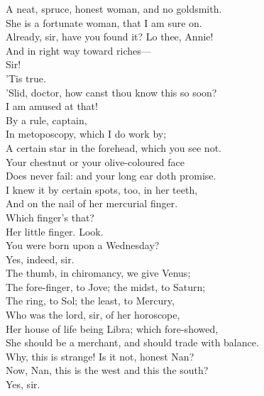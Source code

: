 \documentclass[a4paper,oneside,12pt]{memoir}
\begin{document}
\begin{drama*}
A neat, spruce, honest woman, and no goldsmith.\\
\subtlespeaks She is a fortunate woman, that I am sure on.\\
\facespeaks Already, sir, have you found it? Lo thee, Annie!\\
\subtlespeaks And in right way toward riches---\\
\facespeaks {} Sir!\\
\subtlespeaks {} 'Tis true.\\
\facespeaks 'Slid, doctor, how canst thou know this so soon?\\
I am amused at that!\\
\subtlespeaks {} By a rule, captain,\\
In metoposcopy, which I do work by;\\
A certain star in the forehead, which you see not.\\
Your chestnut or your olive-coloured face\\
Does never fail: and your long ear doth promise.\\
I knew it by certain spots, too, in her teeth,\\
And on the nail of her mercurial finger.\\
\facespeaks Which finger's that?\\
\subtlespeaks {} Her little finger. Look.\\
You were born upon a Wednesday?\\
\druggerspeaks {} Yes, indeed, sir.\\
\subtlespeaks The thumb, in chiromancy, we give Venus;\\
The fore-finger, to Jove; the midst, to Saturn;\\
The ring, to Sol; the least, to Mercury,\\
Who was the lord, sir, of her horoscope,\\
Her house of life being Libra; which fore-showed,\\
She should be a merchant, and should trade with balance.\\
\facespeaks Why, this is strange! Is it not, honest Nan?\\
\subtlespeaks Now, Nan, this is the west and this the south?\\
\druggerspeaks Yes, sir.\\

\end{drama*}
\end{document}
